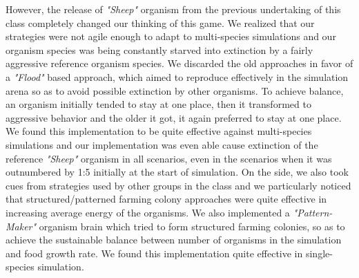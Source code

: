 However, the release of {\em "Sheep"} organism from the previous 
undertaking of this class completely changed our thinking of this game. 
We realized that our strategies were not agile enough to adapt to 
multi-species simulations and our organism species was being constantly 
starved into extinction by a fairly aggressive reference organism species. 
We discarded the old approaches in favor of a {\em "Flood"} based 
approach, which aimed to reproduce effectively in the simulation arena so as 
to avoid possible extinction by other organisms. To achieve balance, an 
organism initially tended to stay at one place, then it transformed to 
aggressive behavior and the older it got, it again preferred to stay at one 
place. 
We found this implementation to be quite effective against multi-species 
simulations and our implementation was even able cause extinction of the 
reference {\em "Sheep"} organism in all scenarios, even in the scenarios 
when it was outnumbered by 1:5 initially at the start of simulation.
On the side, we also took cues from strategies used by other groups in the 
class and we particularly noticed that structured/patterned farming colony 
approaches were quite effective in increasing average energy of the 
organisms. We also implemented a {\em "Pattern-Maker"} organism brain which 
tried to form structured farming colonies, so as to achieve the sustainable 
balance between number of organisms in the simulation and food growth rate. 
We found this implementation quite effective in single-species simulation. 
